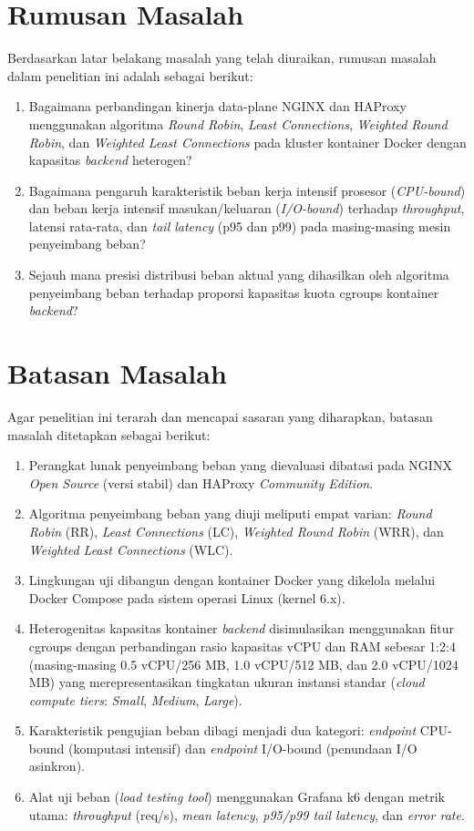\section{Rumusan Masalah}
Berdasarkan latar belakang masalah yang telah diuraikan, rumusan masalah dalam penelitian ini adalah sebagai berikut:
\begin{enumerate}
    \item Bagaimana perbandingan kinerja data-plane NGINX dan HAProxy menggunakan algoritma \textit{Round Robin}, \textit{Least Connections}, \textit{Weighted Round Robin}, dan \textit{Weighted Least Connections} pada kluster kontainer Docker dengan kapasitas \textit{backend} heterogen?
    \item Bagaimana pengaruh karakteristik beban kerja intensif prosesor (\textit{CPU-bound}) dan beban kerja intensif masukan/keluaran (\textit{I/O-bound}) terhadap \textit{throughput}, latensi rata-rata, dan \textit{tail latency} (p95 dan p99) pada masing-masing mesin penyeimbang beban?
    \item Sejauh mana presisi distribusi beban aktual yang dihasilkan oleh algoritma penyeimbang beban terhadap proporsi kapasitas kuota cgroups kontainer \textit{backend}?
\end{enumerate}

\section{Batasan Masalah}
Agar penelitian ini terarah dan mencapai sasaran yang diharapkan, batasan masalah ditetapkan sebagai berikut:
\begin{enumerate}
    \item Perangkat lunak penyeimbang beban yang dievaluasi dibatasi pada NGINX \textit{Open Source} (versi stabil) dan HAProxy \textit{Community Edition}.
    \item Algoritma penyeimbang beban yang diuji meliputi empat varian: \textit{Round Robin} (RR), \textit{Least Connections} (LC), \textit{Weighted Round Robin} (WRR), dan \textit{Weighted Least Connections} (WLC).
    \item Lingkungan uji dibangun dengan kontainer Docker yang dikelola melalui Docker Compose pada sistem operasi Linux (kernel 6.x).
    \item Heterogenitas kapasitas kontainer \textit{backend} disimulasikan menggunakan fitur cgroups dengan perbandingan rasio kapasitas vCPU dan RAM sebesar 1:2:4 (masing-masing 0.5 vCPU/256 MB, 1.0 vCPU/512 MB, dan 2.0 vCPU/1024 MB) yang merepresentasikan tingkatan ukuran instansi standar (\textit{cloud compute tiers}: \textit{Small}, \textit{Medium}, \textit{Large}).
    \item Karakteristik pengujian beban dibagi menjadi dua kategori: \textit{endpoint} CPU-bound (komputasi intensif) dan \textit{endpoint} I/O-bound (penundaan I/O asinkron).
    \item Alat uji beban (\textit{load testing tool}) menggunakan Grafana k6 dengan metrik utama: \textit{throughput} (req/s), \textit{mean latency}, \textit{p95/p99 tail latency}, dan \textit{error rate}.
\end{enumerate}

